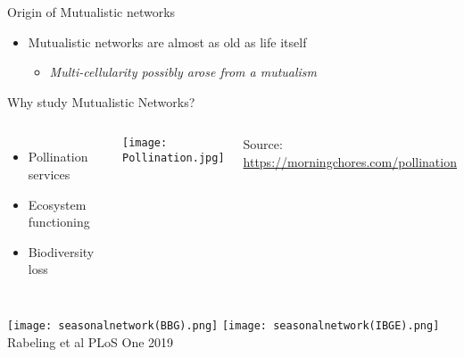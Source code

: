 \begin{frame}{Origin of Mutualistic networks}

  \begin{center}
    
  \end{center}
  \vspace{-10pt}
  
  \begin{itemize}
    \item Mutualistic networks are almost as old as life itself
    \begin{itemize}
      \item \it Multi-cellularity possibly arose from a mutualism 
    \end{itemize}
  \end{itemize}
  
  \end{frame}

\begin{frame}{Why study Mutualistic Networks?}

\begin{columns}[c]
    \begin{itemize}[<+->]\setlength{\itemindent}{0em}\itemsep10pt
      \item Pollination services
      \item Ecosystem functioning
      \item Biodiversity loss 
    \end{itemize}
  \centering
  \texttt{[image: Pollination.jpg]}	\\
  {\tiny Source: \url{https://morningchores.com/pollination}\par}
\end{columns}
\pause
\begin{center}
  \texttt{[image: seasonalnetwork(BBG).png]}
  \texttt{[image: seasonalnetwork(IBGE).png]}\\\tiny Rabeling et al PLoS One 2019  
\end{center}

\end{frame}  

